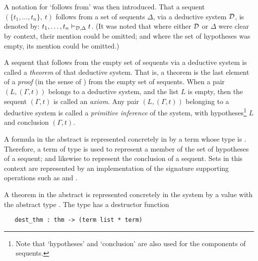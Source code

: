  A notation for `follows from' was then
introduced.  That a sequent $(\{t_1,\ldots,t_n\},\ t)$ follows from a
set of sequents $\Delta$, via a deductive system ${\cal D}$, is
denoted by: $t_1,\ldots,t_n\vdash_{{\cal D},\Delta} t$.  (It was noted
that where either ${\cal D}$ or $\Delta$ were clear by context, their
mention could be omitted; and where the set of hypotheses was empty,
its mention could be omitted.)

A sequent that follows from the empty set of sequents via a deductive
system is called a \textit{theorem} of that deductive system.  That
is, a theorem
%
%
is the last element of a \textit{proof}
%
%
(in the sense of \LOGIC) from the empty set of sequents. When a pair
$(L,(\Gamma,t))$ belongs to a deductive system, and the list $L$ is
empty, then the sequent $(\Gamma,t)$ is called an
\textit{axiom}.  Any pair
$(L,(\Gamma,t))$ belonging to a deductive system is called a
\textit{primitive inference} of the
system, with hypotheses\footnote{Note that `hypotheses' and
  `conclusion' are also used for the components of sequents.} $L$ and
conclusion $(\Gamma,t)$.

A formula
%
%
in the abstract is represented concretely in \HOL{} by a term whose
\HOL{} type is .  Therefore, a term
%
%
of type  is used to represent a member of the set of
hypotheses of a sequent; and likewise to represent the conclusion of a
sequent.  Sets in this context are represented by an implementation of
the \ML{} signature  supporting operations such as
 and .
%

A theorem in the abstract is represented concretely in the \HOL{}
system by a value with the \ML{} abstract type .
%
%
The type  has a destructor function

\begin{holboxed}
\begin{verbatim}
   dest_thm : thm -> (term list * term)
\end{verbatim}
\end{holboxed}


